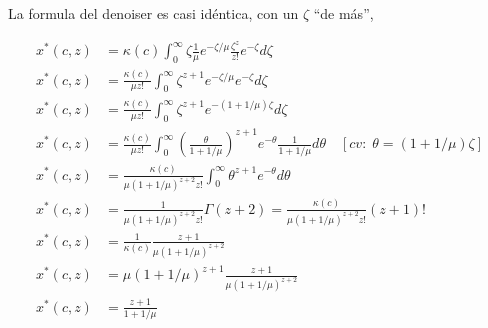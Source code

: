 \documentclass{report}
\def\opt{\ensuremath{^{*}}}
\begin{document}
La formula del denoiser es casi idéntica, con un $\zeta$ ``de más'',

\begin{align}
x\opt(c,z) &= 
  \kappa(c)\int_{0}^{\infty}
  {
    \zeta 
    \frac{1}{\mu}
    e^{-\zeta/\mu}
    \frac{\zeta^z}{z!}
    e^{-\zeta} 
    d\zeta
  } \\
x\opt(c,z) &= 
  \frac{\kappa(c)}{\mu{z!}}
  \int_{0}^{\infty}
  {
    \zeta^{z+1}
    e^{-\zeta/\mu}
    e^{-\zeta} 
    d\zeta
  } \\
x\opt(c,z) &=
  \frac{\kappa(c)}{\mu{z!}}
  \int_{0}^{\infty}
  {
    \zeta^{z+1}
    e^{-(1+1/\mu)\zeta}
    d\zeta
  } \\
x\opt(c,z) &=
\frac{\kappa(c)}{\mu{z!}}\int_{0}^{\infty}
{
  \left(
    \frac{\theta}{1+1/\mu}
  \right)^{z+1}
  e^{-\theta}
  \frac{1}{1+1/\mu}
  d\theta
}
\quad [cv:\;\theta=(1+1/\mu)\zeta] \\
x\opt(c,z) &=
\frac{\kappa(c)}{\mu(1+1/\mu)^{z+2}z!}
\int_{0}^{\infty}
{
  \theta^{z+1}
  e^{-\theta}
  d\theta
} \\
x\opt(c,z) &=
\frac{1}{\mu(1+1/\mu)^{z+2}z!}
\Gamma(z+2) = 
\frac{\kappa(c)}{\mu(1+1/\mu)^{z+2}z!} (z+1)!
\\
x\opt(c,z) &= \frac{1}{\kappa(c)}\frac{z+1}{\mu(1+1/\mu)^{z+2}} \\
x\opt(c,z) &= \mu(1+1/\mu)^{z+1}\frac{z+1}{\mu(1+1/\mu)^{z+2}} \\
x\opt(c,z) &= \frac{z+1}{1+1/\mu} \\
\end{align}
\end{document}
